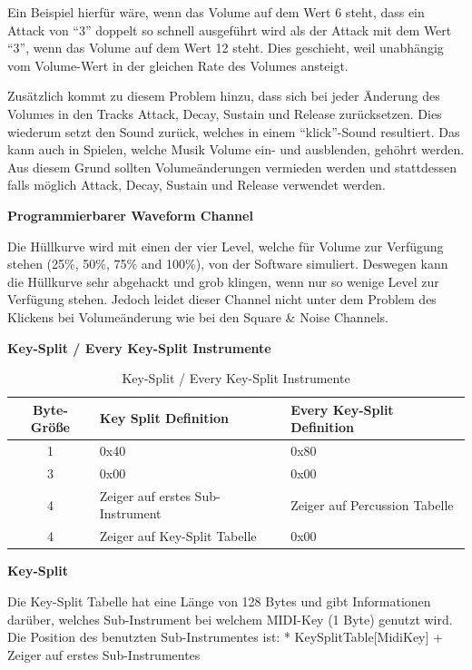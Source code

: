 \documentclass[11pt,a4paper]{scrartcl}
\newcommand{\paratitle}[1] {
    \vspace{5mm}
    \large \textbf{#1} \normalsize
    \vspace{2mm}\newline
}
\begin{document}
Ein Beispiel hierf\"ur w\"are, wenn das Volume auf dem Wert 6 steht, dass ein Attack von \enquote{3} doppelt so schnell ausgef\"uhrt wird als der Attack mit dem Wert \enquote{3}, wenn das Volume auf dem Wert 12 steht. Dies geschieht, weil unabh\"angig vom Volume-Wert in der gleichen Rate des Volumes ansteigt.

Zus\"atzlich kommt zu diesem Problem hinzu, dass sich bei jeder \"Anderung des Volumes in den Tracks Attack, Decay, Sustain und Release zur\"ucksetzen. Dies wiederum setzt den Sound zur\"uck, welches in einem \enquote{klick}-Sound resultiert. Das kann auch in Spielen, welche Musik Volume ein- und ausblenden, geh\"ohrt werden. Aus diesem Grund sollten Volume\"anderungen vermieden werden und stattdessen falls m\"oglich Attack, Decay, Sustain und Release verwendet werden.

\paratitle{Programmierbarer Waveform Channel}
Die H\"ullkurve wird mit einen der vier Level, welche f\"ur Volume zur Verf\"ugung stehen (25\%, 50\%, 75\% and 100\%), von der Software simuliert. Deswegen kann die H\"ullkurve sehr abgehackt und grob klingen, wenn nur so wenige Level zur Verf\"ugung stehen. Jedoch leidet dieser Channel nicht unter dem Problem des Klickens bei Volume\"anderung wie bei den Square \& Noise Channels.


\newpage
\paratitle{Key-Split / Every Key-Split Instrumente}

\begin{table}[h]
    \centering
    \begin{tabular}{ c | p{} | p{}}
        \textbf{Byte-Gr\"o{\ss}e} & \textbf{Key Split Definition} & \textbf{Every Key-Split Definition}\\
        \hline
        1 & 0x40 & 0x80 \\
        \hline
        3 & 0x00 & 0x00 \\
        \hline
        4 & Zeiger auf erstes Sub-Instrument & Zeiger auf Percussion Tabelle \\
        \hline
        4 & Zeiger auf Key-Split Tabelle & 0x00\\
    \end{tabular}
    \caption{Key-Split / Every Key-Split Instrumente}
    \label{table:EveryKey-SplitInstrument}
\end{table}


\paratitle{Key-Split}
Die Key-Split Tabelle hat eine L\"ange von 128 Bytes und gibt Informationen dar\"uber, welches Sub-Instrument bei welchem MIDI-Key (1 Byte) genutzt wird. Die Position des benutzten Sub-Instrumentes ist: * KeySplitTable[MidiKey] + Zeiger auf erstes Sub-Instrumentes
\end{document}
